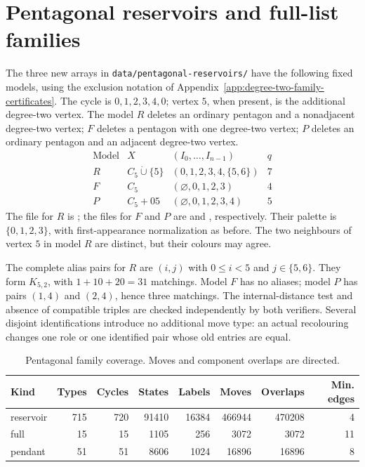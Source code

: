 \section{Pentagonal reservoirs and full-list families}
\label{app:pentagonal-reservoir-certificates}
The three new arrays in \texttt{data/pentagonal-reservoirs/} have the
following fixed models, using the exclusion notation of
Appendix~\ref{app:degree-two-family-certificates}. The cycle is
$0,1,2,3,4,0$; vertex $5$, when present, is the additional degree-two
vertex. The model $R$ deletes an ordinary pentagon and a nonadjacent
degree-two vertex; $F$ deletes a pentagon with one degree-two vertex;
$P$ deletes an ordinary pentagon and an adjacent degree-two vertex.
\[
\begin{array}{cclc}
\text{Model}&X&(I_0,\ldots,I_{n-1})&q\\ \hline
R&C_5\mathbin{\dot\cup}\{5\}&(0,1,2,3,4,\{5,6\})&7\\
F&C_5&(\varnothing,0,1,2,3)&4\\
P&C_5+05&(\varnothing,0,1,2,3,4)&5
\end{array}
\]
The file for $R$ is ; the files for $F$
and $P$ are  and
, respectively. Their palette is $\{0,1,2,3\}$,
with first-appearance normalization as before. The two neighbours of
vertex $5$ in model $R$ are distinct, but their colours may agree.

The complete alias pairs for $R$ are $(i,j)$ with $0\le i<5$ and
$j\in\{5,6\}$. They form $K_{5,2}$, with
$1+10+20=31$ matchings. Model $F$ has no aliases; model $P$ has pairs
$(1,4)$ and $(2,4)$, hence three matchings. The internal-distance test
and absence of compatible triples are checked independently by both
verifiers. Several disjoint identifications introduce no additional move
type: an actual recolouring changes one role or one identified pair
whose old entries are equal.

\begin{table}[htbp]
\centering\small
\caption{Pentagonal family coverage. Moves and component overlaps are directed.}
\label{tab:pentagonal-reservoir-counts}
\begin{tabular}{lrrrrrrr}
\toprule
Kind & Types & Cycles & States & Labels & Moves & Overlaps & Min. edges\\
\midrule
reservoir&715&720&91410&16384&466944&470208&4\\
full&15&15&1105&256&3072&3072&11\\
pendant&51&51&8606&1024&16896&16896&8\\
\bottomrule
\end{tabular}
\end{table}

